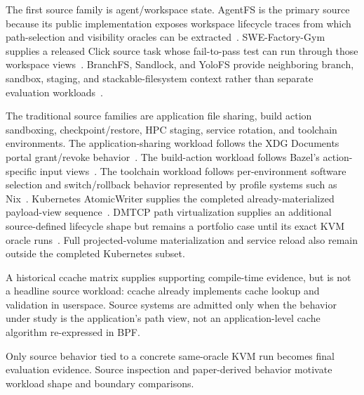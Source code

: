 The first source family is agent/workspace state. AgentFS is the primary source
because its public implementation exposes workspace lifecycle traces
from which path-selection and visibility oracles can be extracted~\cite{agentfs_repo}.
SWE-Factory-Gym supplies a released Click source task whose fail-to-pass test
can run through those workspace views~\cite{swe_factory_repo,swe_factory_gym_dataset}.
BranchFS, Sandlock, and YoloFS provide neighboring branch, sandbox, staging,
and stackable-filesystem context rather than separate evaluation
workloads~\cite{branchfs_repo,sandlock_repo,yolofs_repo}.

The traditional source families are application file sharing, build action
sandboxing, checkpoint/restore, HPC staging, service rotation, and toolchain
environments. The application-sharing workload follows the XDG Documents
portal grant/revoke behavior~\cite{xdg_documents_portal}. The build-action
workload follows Bazel's action-specific input views~\cite{bazel_sandboxing}.
The toolchain workload follows per-environment software selection and
switch/rollback behavior represented by profile systems such as
Nix~\cite{nix_store}. Kubernetes AtomicWriter supplies the completed
already-materialized payload-view sequence~\cite{kubernetes_projected_volumes}.
DMTCP path virtualization supplies an additional source-defined lifecycle
shape but remains a portfolio case until its exact KVM oracle
runs~\cite{dmtcp_path_virtualization}. Full projected-volume materialization
and service reload also remain outside the completed Kubernetes subset.

A historical ccache matrix supplies supporting compile-time evidence, but is
not a headline source workload: ccache already implements cache lookup and
validation in userspace. Source systems are admitted only when the behavior
under study is the application's path view, not an application-level cache
algorithm re-expressed in BPF.

Only source behavior tied to a concrete same-oracle KVM run becomes final
evaluation evidence. Source inspection and paper-derived behavior motivate
workload shape and boundary comparisons.

